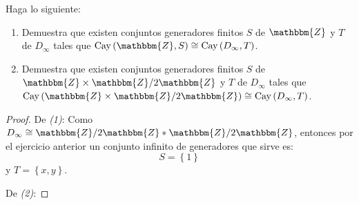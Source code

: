 \documentclass[12pt]{report}
\newcounter{it}
\theoremstyle{largebreak}
\newcommand{\bbm}[1]{\ensuremath{\mathbbm{#1}}}
\newcommand{\Cay}[1]{\ensuremath{\textup{Cay}\left(#1\right)}}
\begin{document}
\begin{sol}
        \begin{center}
        \end{center}

    \end{sol}

    \begin{excer}
        Haga lo siguiente:
        \begin{enumerate}[label = \textit{(\arabic*)}]
            \item Demuestra que existen conjuntos generadores finitos $S$ de $\bbm{Z}$ y $T$ de $D_\infty$ tales que $\Cay{\bbm{Z},S}\cong\Cay{D_\infty,T}$.
            \item Demuestra que existen conjuntos generadores finitos $S$ de $\bbm{Z}\times\bbm{Z}/2\bbm{Z}$ y $T$ de $D_\infty$ tales que $\Cay{\bbm{Z}\times\bbm{Z}/2\bbm{Z}}\cong\Cay{D_\infty,T}$.
        \end{enumerate}
    \end{excer}

    \begin{proof}
        De \textit{(1)}: Como $D_\infty\cong\bbm{Z}/2\bbm{Z}*\bbm{Z}/2\bbm{Z}$, entonces por el ejercicio anterior un conjunto infinito de generadores que sirve es:
        \begin{equation*}
            S=\left\{1\right\}
        \end{equation*}
        y $T=\left\{x,y\right\}$.

        De \textit{(2)}: 
    \end{proof}
\end{document}
